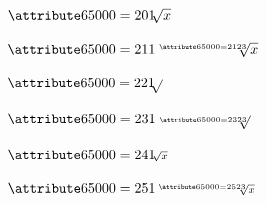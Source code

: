 \documentclass{article}
\begin{document}
\noindent$\begingroup\attribute65000=201 \sqrt[]{x}\endgroup$

\noindent$\begingroup\attribute65000=211 \sqrt[\attribute65000=212 3]{x}\endgroup$

\noindent$\begingroup\attribute65000=221 \sqrt[]{}\endgroup$

\noindent$\begingroup\attribute65000=231 \sqrt[\attribute65000=232 3]{}\endgroup$

\noindent$\begingroup\attribute65000=241 \scriptstyle\sqrt[]{x}\endgroup$

\noindent$\begingroup\attribute65000=251 \scriptstyle\sqrt[\attribute65000=252 3]{x}\endgroup$


\end{document}
